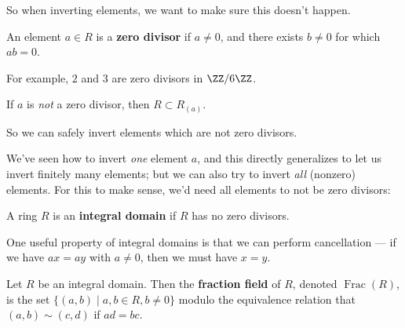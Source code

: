 
So when inverting elements, we want to make sure this doesn't happen. 

\begin{definition}
An element $a \in R$ is a \textbf{zero divisor} if $a \neq 0$, and there exists $b \neq 0$ for which $ab = 0$. 
\end{definition}

For example, $2$ and $3$ are zero divisors in $\ZZ/6\ZZ$.

\begin{proposition}
If $a$ is \emph{not} a zero divisor, then $R \subset R_{(a)}$. 
\end{proposition}

So we can safely invert elements which are not zero divisors. 

We've seen how to invert \emph{one} element $a$, and this directly generalizes to let us invert finitely many elements; but we can also try to invert \emph{all} (nonzero) elements. For this to make sense, we'd need all elements to not be zero divisors:

\begin{definition}
A ring $R$ is an \textbf{integral domain} if $R$ has no zero divisors.
\end{definition}

One useful property of integral domains is that we can perform cancellation --- if we have $ax = ay$ with $a \neq 0$, then we must have $x = y$. 

\begin{definition}
    Let $R$ be an integral domain. Then the \textbf{fraction field} of $R$, denoted $\operatorname{Frac}(R)$, is the set $\{(a, b) \mid a, b \in R, b \neq 0\}$ modulo the equivalence relation that $(a, b) \sim (c, d)$ if $ad = bc$. 
\end{definition}



